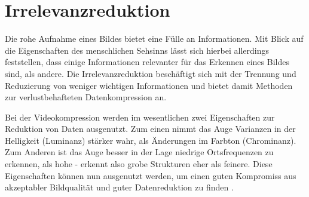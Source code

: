 \chapter{Irrelevanzreduktion}
\label{kap:Irrelevanzreduktion}


Die rohe Aufnahme eines Bildes bietet eine Fülle an Informationen. Mit Blick auf die Eigenschaften des menschlichen Sehsinns lässt sich hierbei allerdings feststellen, dass einige Informationen relevanter für das Erkennen eines Bildes sind, als andere. Die Irrelevanzreduktion beschäftigt sich mit der Trennung und Reduzierung von weniger wichtigen Informationen und bietet damit Methoden zur verlustbehafteten Datenkompression an.

Bei der Videokompression werden im wesentlichen zwei Eigenschaften zur Reduktion von Daten ausgenutzt. Zum einen nimmt das Auge Varianzen in der Helligkeit (Luminanz) stärker wahr, als Änderungen im Farbton (Chrominanz). Zum Anderen ist das Auge besser in der Lage niedrige Ortsfrequenzen zu erkennen, als hohe - erkennt also grobe Strukturen eher als feinere. Diese Eigenschaften können nun ausgenutzt werden, um einen guten Kompromiss aus akzeptabler Bildqualität und guter Datenreduktion zu finden \cite{akramullah_digital_2014}.

